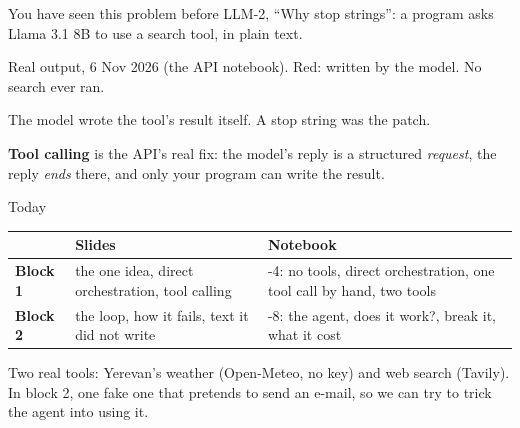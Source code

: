 \documentclass[aspectratio=169]{beamer}
\newcommand{\keybox}[1]{%
  \begin{tcolorbox}[colback=armblue!8, colframe=armblue, boxrule=0.6pt, arc=2pt]
  #1
  \end{tcolorbox}}
\begin{document}
\begin{frame}{You have seen this problem before}
  \vspace{0.2em}
  {\small LLM-2, ``Why stop strings'': a program asks Llama 3.1 8B to use a search tool, in plain text.}

  \vspace{0.3em}

  \vspace{0.2em}
  {\scriptsize\color{gray}Real output, 6 Nov 2026 (the API notebook). Red: written by the model. No
  search ever ran.}

  \vspace{0.5em}
  The model wrote the tool's result itself. A stop string was the patch.

  \vspace{0.4em}
  \keybox{\textbf{Tool calling} is the API's real fix: the model's reply is a structured
  \emph{request}, the reply \emph{ends} there, and only your program can write the result.}
\end{frame}

\begin{frame}{Today}
  \vspace{0.6em}
  \begin{center}
  \small
  \begin{tabular}{l>{\raggedright\arraybackslash}p{}>{\raggedright\arraybackslash}p{}}
    \toprule
    & \textbf{Slides} & \textbf{Notebook} \\
    \midrule
    \textbf{Block 1} & the one idea, direct orchestration, tool calling
      & 1-4: no tools, direct orchestration, one tool call by hand, two tools \\[0.3em]
    \textbf{Block 2} & the loop, how it fails, text it did not write
      & 5-8: the agent, does it work?, break it, what it cost \\
    \bottomrule
  \end{tabular}
  \end{center}

  \vspace{0.8em}
  Two real tools: Yerevan's weather (Open-Meteo, no key) and web search (Tavily). In block 2, one fake
  one that pretends to send an e-mail, so we can try to trick the agent into using it.
\end{frame}
\end{document}
